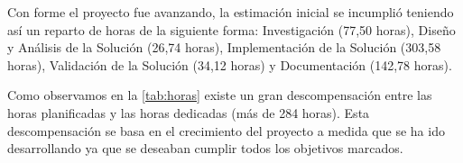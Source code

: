 \documentclass[../main.tex]{subfiles}
\begin{document}
Con forme el proyecto fue avanzando, la estimación inicial se incumplió teniendo así un reparto de horas de la siguiente forma: Investigación (77,50 horas), Diseño y Análisis de la Solución (26,74 horas), Implementación de la Solución (303,58 horas), Validación de la Solución (34,12 horas) y Documentación (142,78 horas).

\begin{table}[H]
    \centering
    \caption{Comparativa de horas estimadas y horas dedicadas al desarrollo del proyecto}
    \label{tab:horas}
\end{table}

Como observamos en la \autoref{tab:horas} existe un gran descompensación entre las horas planificadas y las horas dedicadas (más de 284 horas). Esta descompensación se basa en el crecimiento del proyecto a medida que se ha ido desarrollando ya que se deseaban cumplir todos los objetivos marcados.
\end{document}
